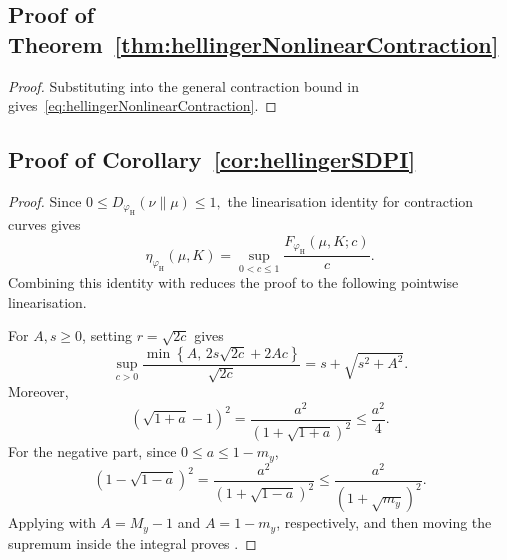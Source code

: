 \documentclass[11pt]{article}
\theoremstyle{plain}
\theoremstyle{remark}
\begin{document}
\subsection{Proof of Theorem~\ref{thm:hellingerNonlinearContraction}}\label{app:proofHellingerNonlinearContraction}
\begin{proof}
Substituting
into the general contraction bound in
gives~\eqref{eq:hellingerNonlinearContraction}.
\end{proof}

\subsection{Proof of Corollary~\ref{cor:hellingerSDPI}}\label{app:proofHellingerSDPI}
\begin{proof}
Since $
    0
    \leq
    D_{\varphi_{\mathrm H}}(\nu\|\mu)
    \leq
    1,$ 
the linearisation identity for contraction curves gives
\begin{equation}
    \eta_{\varphi_{\mathrm H}}(\mu,K)
    =
    \sup_{0<c\leq 1}
    \frac{
        F_{\varphi_{\mathrm H}}(\mu,K;c)
    }{c}.
\end{equation}
Combining this identity with
 reduces the proof to the following pointwise linearisation.

For $A,s\geq0$, setting $r=\sqrt{2c}$ gives
\begin{equation}
    \sup_{c>0}
    \frac{
        \min\left\{
            A,\,
            2s\sqrt{2c}+2Ac
        \right\}
    }{
        \sqrt{2c}
    }
    =
    s+\sqrt{s^2+A^2}.
    \label{eq:normalizedClippedSquareRootLinearization}
\end{equation}
Moreover,
\begin{equation}
    \left(\sqrt{1+a}-1\right)^2
    =
    \frac{a^2}{
        \left(1+\sqrt{1+a}\right)^2
    }
    \leq
    \frac{a^2}{4}.
\end{equation}
For the negative part, since $0\leq a\leq1-m_y$,
\begin{equation}
    \left(1-\sqrt{1-a}\right)^2
    =
    \frac{a^2}{
        \left(1+\sqrt{1-a}\right)^2
    }
    \leq
    \frac{a^2}{
        \left(1+\sqrt{m_y}\right)^2
    }.
\end{equation}
Applying
with $A=M_y-1$ and $A=1-m_y$, respectively, and then moving the
supremum inside the integral proves
.
\end{proof}
\end{document}
